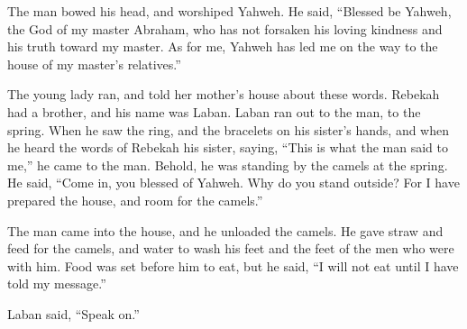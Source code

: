  The man bowed his head, and worshiped Yahweh.
 He said, ``Blessed be Yahweh, the God of my master
Abraham, who has not forsaken his loving kindness and his truth toward
my master. As for me, Yahweh has led me on the way to the house of my
master's relatives.''

 The young lady ran, and told her mother's house about
these words.  Rebekah had a brother, and his name was
Laban. Laban ran out to the man, to the spring.  When he
saw the ring, and the bracelets on his sister's hands, and when he heard
the words of Rebekah his sister, saying, ``This is what the man said to
me,'' he came to the man. Behold, he was standing by the camels at the
spring.  He said, ``Come in, you blessed of Yahweh. Why
do you stand outside? For I have prepared the house, and room for the
camels.''

 The man came into the house, and he unloaded the camels.
He gave straw and feed for the camels, and water to wash his feet and
the feet of the men who were with him.  Food was set
before him to eat, but he said, ``I will not eat until I have told my
message.''

Laban said, ``Speak on.''

